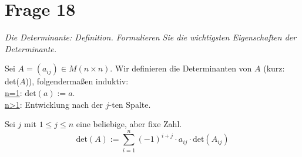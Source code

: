 \section{Frage 18}
\textit{Die Determinante: Definition. Formulieren Sie die wichtigsten Eigenschaften der Determinante.}

\begin{definition}[Determinante]
    Sei $A=(a_{ij})\in M(n\times n)$. Wir definieren die Determinanten von 
    $A$ (kurz: det($A$)), folgendermaßen induktiv:\\
    \underline{n=1}: $\mathrm{det}(a) := a$.\\
    \underline{n>1}: Entwicklung nach der $j$-ten Spalte.

    Sei $j$ mit $1\leq j \leq n$ eine beliebige, aber fixe Zahl.
    \[
    \mathrm{det}(A):= \sum_{i=1}^{n}(-1)^{i+j}\cdot a_{ij} \cdot \mathrm{det}(A_{ij})\]
\end{definition}

